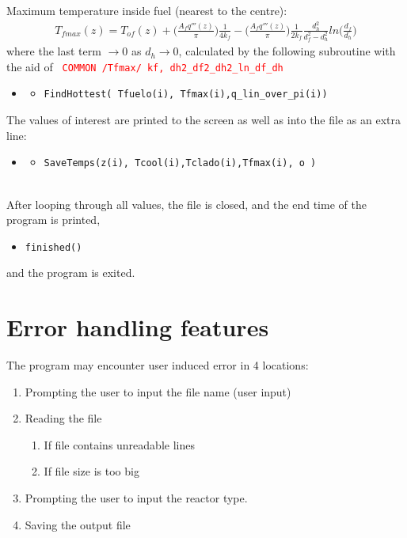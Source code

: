 \documentclass[a4paper, 12pt]{article}
\begin{document}
Maximum temperature inside fuel (nearest to the centre):
\begin{align}
T_{fmax}(z) = T_{of}(z)+ \bigg(\frac{A_f q'''(z)}{\pi}\bigg) \frac{1}{4 k_f}  
- \bigg(\frac{A_f q'''(z)}{\pi}\bigg) \frac{1}{2 k_f} \frac{d_h^2}{d_f^2-d_h^2} ln\bigg(\frac{d_f}{d_h}\bigg)\label{Tfmax}
\end{align}
where the last term $\rightarrow 0$  as $d_h\rightarrow 0$,
calculated by the following subroutine with the aid of \texttt{ \textcolor{red} {COMMON /Tfmax/ kf, dh2\_df2\_dh2\_ln\_df\_dh} }
\begin{itemize}
	\item[]
	\begin{itemize}
	\item \texttt{\textcolor{subr}{FindHottest}(   Tfuelo(i), Tfmax(i),q\_lin\_over\_pi(i))}
	\end  {itemize}
\end  {itemize}

The values of interest are printed to the screen as well as into the file as an extra line:
\begin{itemize}
	\item[]
	\begin{itemize}
	\item \texttt{\textcolor{subr}{SaveTemps}(z(i), Tcool(i),Tclado(i),Tfmax(i), o     )}
	\end  {itemize}
\end  {itemize}

\ \\
After looping through all values, the file is closed, and the end time of the program is printed,
\begin{itemize}
	\item \texttt{\textcolor{subr}{finished}()}
\end{itemize}
and the program is exited.

\section{Error handling features}
The program may encounter user induced error in 4 locations:
\begin{enumerate}
	\item Prompting the user to input the file name (user input)
	\item Reading the file
	\begin{enumerate}
		\item If file contains unreadable lines
		\item If file size is too big
	\end{enumerate}
	\item Prompting the user to input the reactor type.
	\item Saving the output file
\end  {enumerate}
\end{document}
